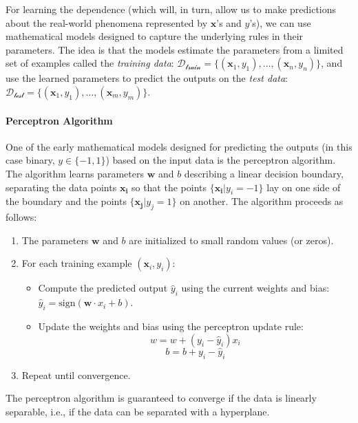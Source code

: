 For learning the dependence (which will, in turn, allow us to make predictions about the real-world phenomena represented by $\mathbf{x}$'s and $y$'s), we can use mathematical models designed to capture the underlying rules in their parameters. The idea is that the models estimate the parameters from a limited set of examples called the \textit{training data}:  $\mathcal{D_{\text{train}}} = \{(\mathbf{x}_1, y_1), \ldots, (\mathbf{x}_{n}, y_{n})\}$, and use the learned parameters to predict the outputs on the \textit{test data}: $\mathcal{D_{\text{test}}} = \{(\mathbf{x}_1, y_1), \ldots, (\mathbf{x}_{m}, y_{m})\}$.

\paragraph{Perceptron Algorithm} One of the early mathematical models designed for predicting the outputs (in this case binary, $y \in \{-1, 1\}$) based on the input data is the perceptron algorithm. The algorithm learns parameters $\textbf{w}$ and $b$ describing a linear decision boundary, separating the data points $\mathbf{x_i}$ so that the points $\{\mathbf{x_i} | y_i = -1\}$ lay on one side of the boundary and the points $\{\mathbf{x_j} | y_j = 1\}$ on another. The algorithm proceeds as follows:




\begin{enumerate}
    \item The parameters $\textbf{w}$ and $b$ are initialized to small random values (or zeros).
    \item For each training example $(\mathbf{x}_i, y_i)$:
          \begin{itemize}
              \item Compute the predicted output $\hat{y}_i$ using the current weights and bias: $\hat{y}_i = \text{sign}(\textbf{w} \cdot x_i + b)$.
              \item Update the weights and bias using the perceptron update rule:
                    \[ w = w + (y_i - \hat{y}_i) x_i \]
                    \[ b = b + y_i - \hat{y}_i \]
          \end{itemize}
    \item Repeat until convergence.
\end{enumerate}

The perceptron algorithm is guaranteed to converge if the data is linearly separable, i.e., if the data can be separated with a hyperplane.



